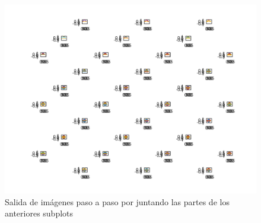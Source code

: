 \documentclass{article}
\begin{document}
\begin{figure}[H]
    \centering
    \includegraphics[width=\linewidth]{salida1.png}
    \caption{Salida de imágenes paso a paso por juntando las partes de los anteriores subplots}
    \label{fig:img_all}
\end{figure}
\end{document}
